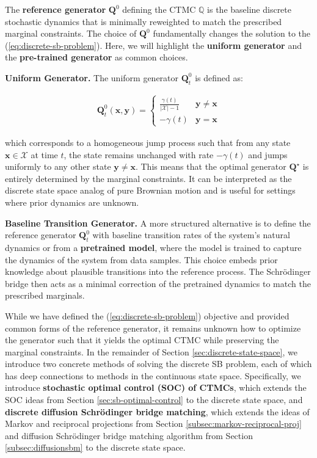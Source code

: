 \documentclass{article}
\newcommand{\purple}[2][]{%
  \begin{purplebox}[#1]
    #2
  \end{purplebox}
}
\newcommand{\boldtext}[1]{\textbf{\textcolor{MyGreen}{#1}}}
\begin{document}
\purple[Forms of the Reference Generator for CTMCs]{
The \textbf{reference generator} $\boldsymbol{Q}^0$ defining the CTMC $\mathbb{Q}$ is the baseline discrete stochastic dynamics that is minimally reweighted to match the prescribed marginal constraints. The choice of $\boldsymbol{Q}^0$ fundamentally changes the solution to the (\ref{eq:discrete-sb-problem}). Here, we will highlight the \boldtext{uniform generator} and the \boldtext{pre-trained generator} as common choices. 

\textbf{Uniform Generator. }The uniform generator $\boldsymbol{Q}^0_t$ is defined as:
\begin{small}
\begin{align}
    \boldsymbol{Q}^0_t(\boldsymbol{x},\boldsymbol{y})=\begin{cases}
    \frac{\gamma(t)}{|\mathcal{X}|-1}&\boldsymbol{y}\neq \boldsymbol{x}\\
    -\gamma(t)&\boldsymbol{y}=\boldsymbol{x}\tag{Uniform Generator}
\end{cases}
\end{align}
\end{small}
which corresponds to a homogeneous jump process such that from any state $\boldsymbol{x}\in \mathcal{X}$ at time $t$, the state remains unchanged with rate $-\gamma(t)$ and jumps uniformly to any other state $\boldsymbol{y}\neq \boldsymbol{x}$. This means that the optimal generator $\boldsymbol{Q}^\star$ is entirely determined by the marginal constraints. It can be interpreted as the discrete state space analog of pure Brownian motion and is useful for settings where prior dynamics are unknown. 

\textbf{Baseline Transition Generator. } A more structured alternative is to define the reference generator $\boldsymbol{Q}^0_t$ with baseline transition rates of the system's natural dynamics or from a \textbf{pretrained model}, where the model is trained to capture the dynamics of the system from data samples. This choice embeds prior knowledge about plausible transitions into the reference process. The Schrödinger bridge then acts as a minimal correction of the pretrained dynamics to match the prescribed marginals.
}

While we have defined the (\ref{eq:discrete-sb-problem}) objective and provided common forms of the reference generator, it remains unknown how to optimize the generator such that it yields the optimal CTMC while preserving the marginal constraints. In the remainder of Section \ref{sec:discrete-state-space}, we introduce two concrete methods of solving the discrete SB problem, each of which has deep connections to methods in the continuous state space. Specifically, we introduce \textbf{stochastic optimal control (SOC) of CTMCs}, which extends the SOC ideas from Section \ref{sec:sb-optimal-control} to the discrete state space, and \textbf{discrete diffusion Schrödinger bridge matching}, which extends the ideas of Markov and reciprocal projections from Section \ref{subsec:markov-reciprocal-proj} and diffusion Schrödinger bridge matching algorithm from Section \ref{subsec:diffusionsbm} to the discrete state space. 
\end{document}
